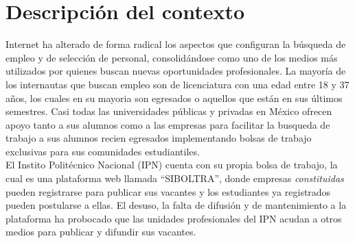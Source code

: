 \section{Descripción del contexto}
	Internet ha alterado de forma radical los aspectos que configuran la búsqueda de empleo y de selección de personal, 
	consolidándose como uno de los medios más utilizados por quienes buscan nuevas oportunidades profesionales. 
	La mayoría de los internautas que buscan empleo son de licenciatura con una edad entre 18 y 37 años, los cuales en su
	mayoria son egresados o aquellos que están en sus últimos semestres.
	Casi todas las universidades públicas y privadas en México ofrecen apoyo tanto a sus alumnos como a las empresas 
	para facilitar la busqueda de trabajo a sus alumnos recien egresados  implementando bolsas de trabajo 
	exclusivas para sus comunidades estudiantiles.\\
	\newline
	El Instito Politécnico Nacional (IPN) cuenta con su propia bolsa de trabajo, la cual es una plataforma web llamada ``SIBOLTRA'', 
	donde empresas \textit{constituidas} pueden registrarse para publicar sus vacantes y los estudiantes ya registrados pueden postularse a ellas. 
	El desuso, la falta de difusión y de mantenimiento a la plataforma ha probocado que las unidades profesionales del IPN acudan a otros 
	medios para publicar y difundir sus vacantes.\\
	
	